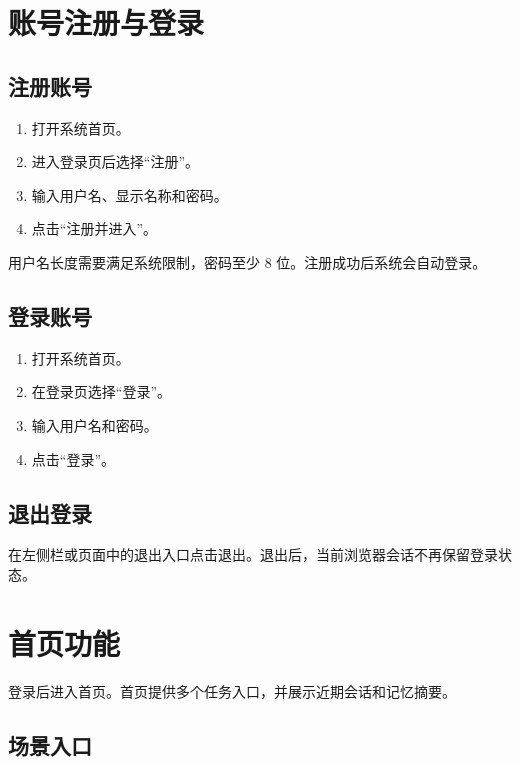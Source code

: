 \documentclass[UTF8,a4paper,12pt]{ctexart}
\begin{document}
\section{账号注册与登录}

\subsection{注册账号}

\begin{enumerate}[leftmargin=2em]
  \item 打开系统首页。
  \item 进入登录页后选择“注册”。
  \item 输入用户名、显示名称和密码。
  \item 点击“注册并进入”。
\end{enumerate}

用户名长度需要满足系统限制，密码至少 8 位。注册成功后系统会自动登录。

\subsection{登录账号}

\begin{enumerate}[leftmargin=2em]
  \item 打开系统首页。
  \item 在登录页选择“登录”。
  \item 输入用户名和密码。
  \item 点击“登录”。
\end{enumerate}

\subsection{退出登录}

在左侧栏或页面中的退出入口点击退出。退出后，当前浏览器会话不再保留登录状态。

\section{首页功能}

登录后进入首页。首页提供多个任务入口，并展示近期会话和记忆摘要。

\subsection{场景入口}
\end{document}
